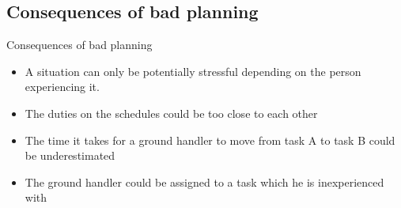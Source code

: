 \subsection{Consequences of bad planning}
\begin{frame}{Consequences of bad planning}{}
    \begin{itemize}
        \item A situation can only be potentially stressful depending on the person experiencing it.
        \item The duties on the schedules could be too close to each other
        \item The time it takes for a ground handler to move from task A to task B could be underestimated
        \item The ground handler could be assigned to a task which he is inexperienced with
    \end{itemize}
\end{frame}

